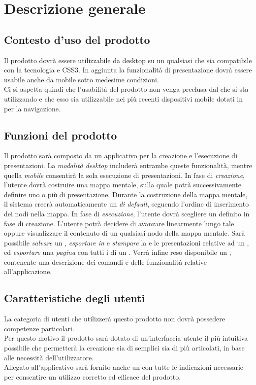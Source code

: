\section{Descrizione generale}
\subsection{Contesto d'uso del prodotto}
Il prodotto dovrà essere utilizzabile da desktop su un qualsiasi  che sia compatibile con la tecnologia  e CSS3. In aggiunta la funzionalità di presentazione dovrà essere usabile anche da mobile sotto medesime condizioni.\\
Ci si aspetta quindi che l'usabilità del prodotto non venga preclusa dal  che si sta utilizzando e che esso sia utilizzabile nei più recenti dispositivi mobile dotati in  per la navigazione.
\subsection{Funzioni del prodotto}\label{funzioniProdotto}
Il prodotto sarà composto da un applicativo  per la creazione e l'esecuzione di presentazioni.
La \emph{modalità desktop} includerà entrambe queste funzionalità, mentre quella \emph{mobile} consentirà la sola esecuzione di presentazioni.
In fase di \emph{creazione}, l'utente dovrà costruire una mappa mentale, sulla quale potrà successivamente definire uno o più  di presentazione. Durante la costruzione della mappa mentale, il sistema creerà automaticamente un \emph{ di default}, seguendo l'ordine di inserimento dei nodi nella mappa.
In fase di \emph{esecuzione}, l'utente dovrà scegliere un  definito in fase di creazione. L'utente potrà decidere di avanzare linearmente lungo tale  oppure visualizzare il contenuto di un qualsiasi nodo della mappa mentale.
Sarà possibile \emph{salvare} un , \emph{esportare in } e \emph{stampare} la  e le presentazioni relative ad un , ed \emph{esportare} una \emph{pagina } con tutti i  di un .
Verrà infine reso disponibile un \MU, contenente una descrizione dei comandi e delle funzionalità relative all'applicazione.
\subsection{Caratteristiche degli utenti}
La categoria di utenti che utilizzerà questo prodotto non dovrà possedere competenze particolari.\\
Per questo motivo il prodotto sarà dotato di un'interfaccia utente il più intuitiva possibile che permetterà la creazione sia di  semplici sia di  più articolati, in base alle necessità dell'utilizzatore.\\
Allegato all'applicativo sarà fornito anche un \MU con tutte le indicazioni necessarie per consentire un utilizzo corretto ed efficace del prodotto.
